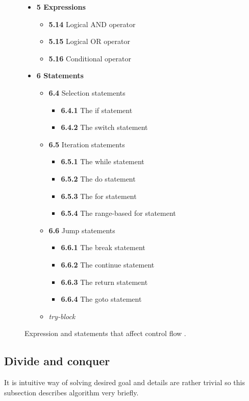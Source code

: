 \begin{figure}[t!]
\caption{Expression and statements that affect control flow \cite{standard}.}
\label{control-stmt-expr}
\begin{itemize}
\item{\textbf{5 Expressions}}
	\begin{itemize}
	\item{\textbf{5.14} Logical AND operator}
	\item{\textbf{5.15} Logical OR operator}
	\item{\textbf{5.16} Conditional operator}
	\end{itemize}
\item{\textbf{6 Statements}}
	\begin{itemize}
	\item{\textbf{6.4} Selection statements}
		\begin{itemize}
		\item{\textbf{6.4.1} The if statement}
		\item{\textbf{6.4.2} The switch statement}
		\end{itemize}
	\item{\textbf{6.5} Iteration statements}
		\begin{itemize}
		\item{\textbf{6.5.1} The while statement}
		\item{\textbf{6.5.2} The do statement}
		\item{\textbf{6.5.3} The for statement}
		\item{\textbf{6.5.4} The range-based for statement}
		\end{itemize}
	\item{\textbf{6.6} Jump statements}
		\begin{itemize}
		\item{\textbf{6.6.1} The break statement}
		\item{\textbf{6.6.2} The continue statement}
		\item{\textbf{6.6.3} The return statement}
		\item{\textbf{6.6.4} The goto statement}
		\end{itemize}
	\item{\textit{try-block}}
	\end{itemize}
\end{itemize}
\end{figure}

\subsection{Divide and conquer}
It is intuitive way of solving desired goal and details are rather trivial so this subsection describes algorithm very briefly.

